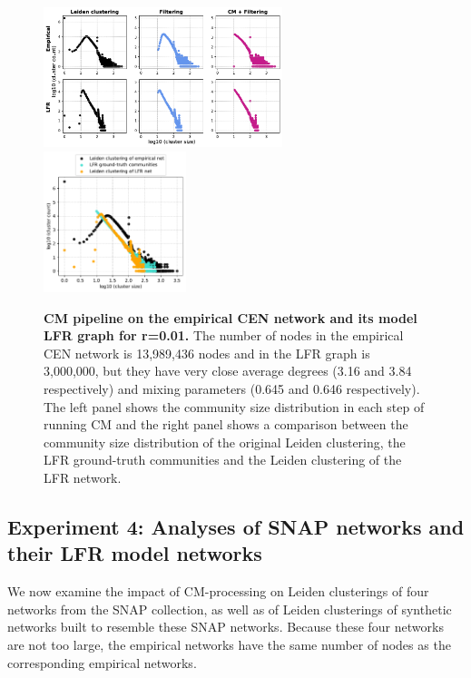 \documentclass[11pt]{article}   	%
\begin{document}
\begin{figure}[h!]
\centering
\includegraphics[width=0.62\textwidth]{figs/cen_cm_steps_lfr01.pdf}
\includegraphics[width=0.37\textwidth]{figs/cen_01_cm_size.pdf}
\caption[CM pipeline on the empirical CEN network and its model LFR graph for r=0.01]{\textbf{CM pipeline on the empirical CEN network and its model LFR graph for r=0.01.} The number of nodes in the empirical CEN network is 13,989,436 nodes and in the LFR graph is 3,000,000, but they have very close average degrees (3.16 and 3.84 respectively) and mixing parameters (0.645 and 0.646 respectively). The left panel shows the community size distribution in each step of running CM and the right panel shows a comparison between the community size distribution of the original Leiden clustering, the LFR ground-truth communities and the Leiden clustering of the LFR network.}
\label{fig:cen-cm-lfr-01}
\end{figure}

\subsection{Experiment 4: Analyses of SNAP networks and their LFR model networks}

We now examine the impact of CM-processing on Leiden clusterings of four  networks from the SNAP collection, as well as of
Leiden clusterings of synthetic networks built to resemble these SNAP networks.
Because these four networks are not too large, the empirical networks have the same number of nodes as the corresponding empirical networks.
\end{document}
